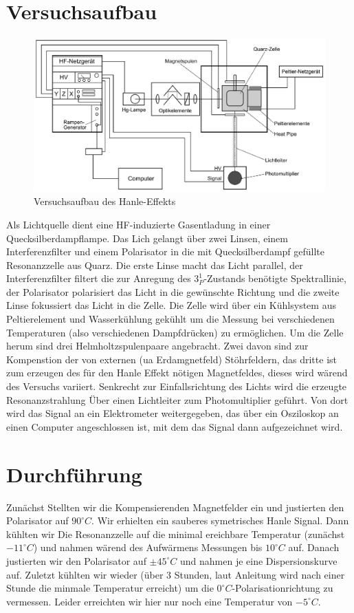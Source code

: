 \documentclass[12pt]{article}
\begin{document}
\section{Versuchsaufbau}
\begin{figure}[H]  
\centering
\includegraphics[width=0.7\linewidth]{pictures/Aufbau.ps}
\caption{Versuchsaufbau des Hanle-Effekts}
\end{figure}

Als Lichtquelle dient eine HF-induzierte Gasentladung in einer Quecksilberdampflampe. Das Lich gelangt über zwei Linsen, einem Interferenzfilter und einem Polarisator in die mit Quecksilberdampf gefüllte Resonanzzelle aus Quarz. Die erste Linse macht das Licht parallel, der Interferenzfilter filtert die zur Anregung des $3_P^1$-Zustands benötigte Spektrallinie, der Polarisator polarisiert das Licht in die gewünschte Richtung und die zweite Linse fokussiert das Licht in die Zelle. Die Zelle wird über ein Kühlsystem aus Peltierelement und Wasserkühlung gekühlt um die Messung bei verschiedenen Temperaturen (also verschiedenen Dampfdrücken) zu ermöglichen. Um die Zelle herum sind drei Helmholtzspulenpaare angebracht. Zwei davon sind zur Kompenstion der von externen (ua Erdamgnetfeld) Stöhrfeldern, das dritte ist zum erzeugen des für den Hanle Effekt nötigen Magnetfeldes, dieses wird wärend des Versuchs variiert. Senkrecht zur Einfallsrichtung des Lichts wird die erzeugte Resonanzstrahlung Über einen Lichtleiter zum Photomultiplier geführt. Von dort wird das Signal an ein Elektrometer weitergegeben, das über ein Osziloskop an einen Computer angeschlossen ist, mit dem das Signal dann aufgezeichnet wird.
\newpage

\section{Durchführung}
Zunächst Stellten wir die Kompensierenden Magnetfelder ein und justierten den Polarisator auf $90^\circ C$. Wir erhielten ein sauberes symetrisches Hanle Signal. Dann kühlten wir Die Resonanzzelle auf die minimal ereichbare Temperatur (zunächst $-11^\circ C$) und nahmen wärend des Aufwärmens Messungen bis $10^\circ C$ auf. Danach justierten wir den Polarisator auf $\pm 45^\circ C$ und nahmen je eine Dispersionskurve auf. Zuletzt kühlten wir wieder (über 3 Stunden, laut Anleitung wird nach einer Stunde die minmale Temperatur erreicht) um die $0^\circ C$-Polarisationrichtung zu vermessen. Leider erreichten wir hier nur noch eine Temperatur von $-5^\circ C$. 
\end{document}
